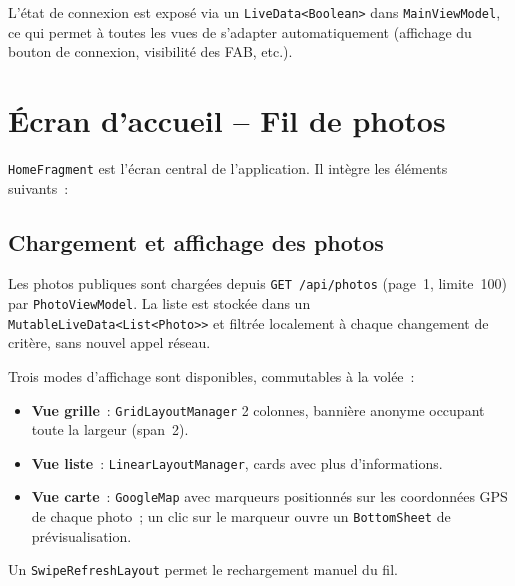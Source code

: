 \documentclass[12pt, a4paper, openany]{report}
\begin{document}
L'état de connexion est exposé via un \texttt{LiveData<Boolean>} dans \texttt{MainViewModel},
ce qui permet à toutes les vues de s'adapter automatiquement (affichage du bouton de
connexion, visibilité des FAB, etc.).

\section{Écran d'accueil -- Fil de photos}

\texttt{HomeFragment} est l'écran central de l'application. Il intègre les éléments suivants~:

\subsection{Chargement et affichage des photos}

Les photos publiques sont chargées depuis \texttt{GET /api/photos} (page~1, limite~100) par
\texttt{PhotoViewModel}. La liste est stockée dans un \texttt{MutableLiveData<List<Photo>>}
et filtrée localement à chaque changement de critère, sans nouvel appel réseau.

Trois modes d'affichage sont disponibles, commutables à la volée~:

\begin{itemize}
  \item \textbf{Vue grille}~: \texttt{GridLayoutManager} 2 colonnes, bannière anonyme
        occupant toute la largeur (span~2).
  \item \textbf{Vue liste}~: \texttt{LinearLayoutManager}, cards avec plus d'informations.
  \item \textbf{Vue carte}~: \texttt{GoogleMap} avec marqueurs positionnés sur les
        coordonnées GPS de chaque photo~; un clic sur le marqueur ouvre un
        \texttt{BottomSheet} de prévisualisation.
\end{itemize}

Un \texttt{SwipeRefreshLayout} permet le rechargement manuel du fil.
\end{document}
